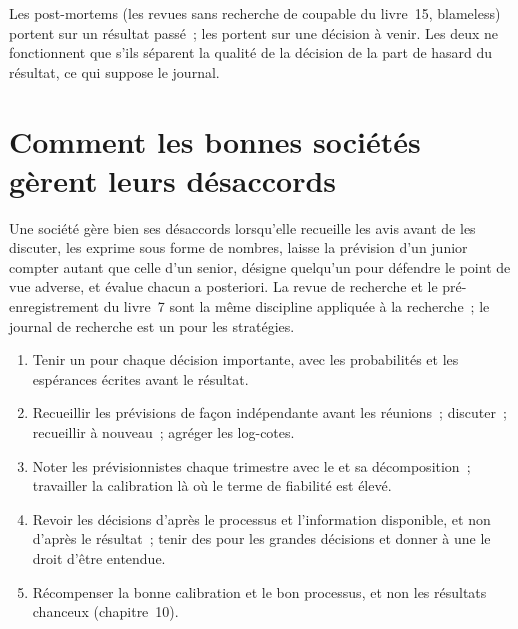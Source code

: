 Les post-mortems (les revues sans recherche de coupable du livre~15, blameless) portent sur un résultat passé~; les  portent sur une décision à venir. Les deux ne fonctionnent que s'ils séparent la
qualité de la décision de la part de hasard du résultat, ce qui suppose le journal.

\section{Comment les bonnes sociétés gèrent leurs désaccords}

Une société gère bien ses désaccords lorsqu'elle recueille les avis avant de les discuter, les exprime sous forme de nombres, laisse la prévision d'un junior compter autant que celle
d'un senior, désigne quelqu'un pour défendre le point de vue adverse, et évalue chacun a posteriori. La revue de recherche et le pré-enregistrement du livre~7 sont la même
discipline appliquée à la recherche~; le journal de recherche est un  pour les stratégies.

\begin{method}\label{met:fm:culture-and-decision-making:run}
\begin{enumerate}
\item Tenir un  pour chaque décision importante, avec les probabilités et les espérances écrites avant le résultat.
\item Recueillir les prévisions de façon indépendante avant les réunions~; discuter~; recueillir à nouveau~; agréger les log-cotes.
\item Noter les prévisionnistes chaque trimestre avec le  et sa décomposition~; travailler la calibration là où le terme de fiabilité est élevé.
\item Revoir les décisions d'après le processus et l'information disponible, et non d'après le résultat~; tenir des  pour les grandes décisions et donner à une 
le droit d'être entendue.
\item Récompenser la bonne calibration et le bon processus, et non les résultats chanceux (chapitre~10).
\end{enumerate}
\end{method}

